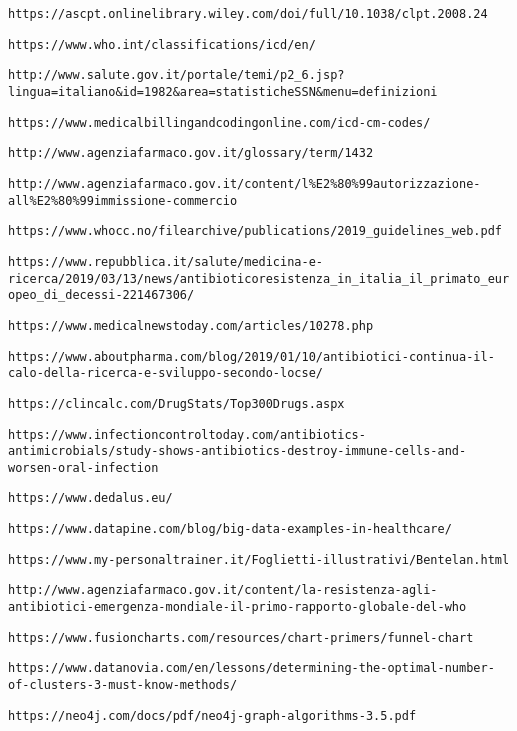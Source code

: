 \begin{thebibliography}{}
	\texttt{https://ascpt.onlinelibrary.wiley.com/doi/full/10.1038/clpt.2008.24}
	
	\texttt{https://www.who.int/classifications/icd/en/}
	
	\texttt{http://www.salute.gov.it/portale/temi/p2\_6.jsp?lingua=italiano\&id=1982\&area=statisticheSSN\&menu=definizioni}
	
	\texttt{https://www.medicalbillingandcodingonline.com/icd-cm-codes/}
	
	\texttt{http://www.agenziafarmaco.gov.it/glossary/term/1432}
	
	\texttt{http://www.agenziafarmaco.gov.it/content/l\%E2\%80\%99autorizzazione-all\%E2\%80\%99immissione-commercio}
	
	\texttt{https://www.whocc.no/filearchive/publications/2019\_guidelines\_web.pdf}
	
	\texttt{https://www.repubblica.it/salute/medicina-e-ricerca/2019/03/13/news/antibioticoresistenza\_in\_italia\_il\_primato\_europeo\_di\_decessi-221467306/}
	
	\texttt{https://www.medicalnewstoday.com/articles/10278.php}
	
	\texttt{https://www.aboutpharma.com/blog/2019/01/10/antibiotici-continua-il-calo-della-ricerca-e-sviluppo-secondo-locse/}
	
	\texttt{https://clincalc.com/DrugStats/Top300Drugs.aspx}
	
	\texttt{https://www.infectioncontroltoday.com/antibiotics-antimicrobials/study-shows-antibiotics-destroy-immune-cells-and-worsen-oral-infection}
	
	\texttt{https://www.dedalus.eu/}
	
	\texttt{https://www.datapine.com/blog/big-data-examples-in-healthcare/}
	
	\texttt{https://www.my-personaltrainer.it/Foglietti-illustrativi/Bentelan.html}
	
	\texttt{http://www.agenziafarmaco.gov.it/content/la-resistenza-agli-antibiotici-emergenza-mondiale-il-primo-rapporto-globale-del-who}
	
	\texttt{https://www.fusioncharts.com/resources/chart-primers/funnel-chart}
	
	\texttt{https://www.datanovia.com/en/lessons/determining-the-optimal-number-of-clusters-3-must-know-methods/}
	
	\texttt{https://neo4j.com/docs/pdf/neo4j-graph-algorithms-3.5.pdf}
	
\end{thebibliography}
	